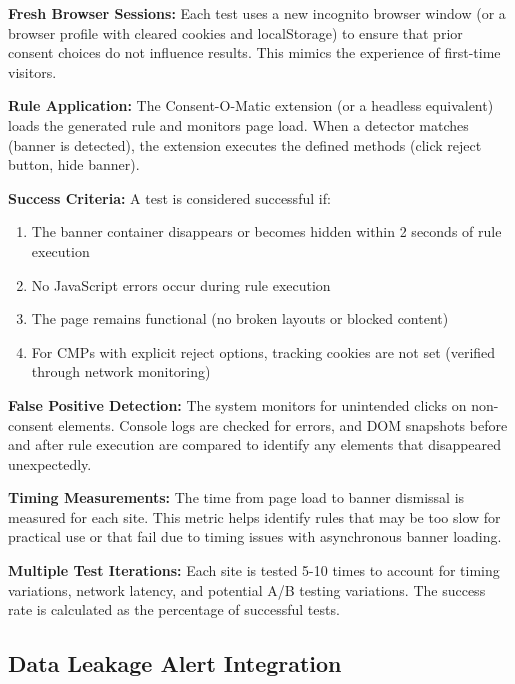 \documentclass[conference]{IEEEtran}
\begin{document}
\textbf{Fresh Browser Sessions:} Each test uses a new incognito browser window (or a browser profile with cleared cookies and localStorage) to ensure that prior consent choices do not influence results. This mimics the experience of first-time visitors.

\textbf{Rule Application:} The Consent-O-Matic extension (or a headless equivalent) loads the generated rule and monitors page load. When a detector matches (banner is detected), the extension executes the defined methods (click reject button, hide banner).

\textbf{Success Criteria:} A test is considered successful if:

\begin{enumerate}

    \item The banner container disappears or becomes hidden within 2 seconds of rule execution

    \item No JavaScript errors occur during rule execution

    \item The page remains functional (no broken layouts or blocked content)

    \item For CMPs with explicit reject options, tracking cookies are not set (verified through network monitoring)

\end{enumerate}

\textbf{False Positive Detection:} The system monitors for unintended clicks on non-consent elements. Console logs are checked for errors, and DOM snapshots before and after rule execution are compared to identify any elements that disappeared unexpectedly.

\textbf{Timing Measurements:} The time from page load to banner dismissal is measured for each site. This metric helps identify rules that may be too slow for practical use or that fail due to timing issues with asynchronous banner loading.

\textbf{Multiple Test Iterations:} Each site is tested 5-10 times to account for timing variations, network latency, and potential A/B testing variations. The success rate is calculated as the percentage of successful tests.

\subsection{Data Leakage Alert Integration}
\end{document}
